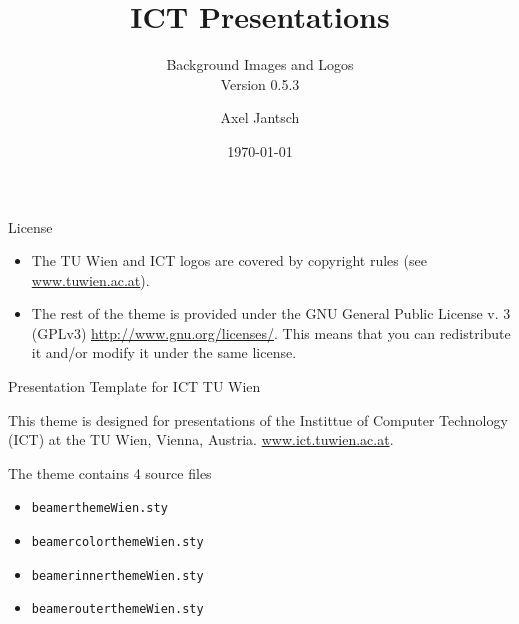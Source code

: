 \documentclass[aspectratio=169]{beamer}
\title[ICT Presentations]{ICT Presentations}
\subtitle{Background Images and Logos\\
Version 0.5.3}
\author[A. Jantsch]{Axel Jantsch}
\institute[TU Wien]{TU Wien, Vienna, Austria}
\date{\today}
\begin{document}
\begin{frame}
  \titlepage
\end{frame}      


\begin{frame}{License}
  
\begin{itemize}
\item The TU Wien and ICT logos are covered by copyright rules (see
  \href{www.tuwien.ac.at}{www.tuwien.ac.at}).
\item The rest of the theme is provided under the GNU General Public
  License v. 3 (GPLv3) \href{http://www.gnu.org/licenses/}{http://www.gnu.org/licenses/}. This means that you can redistribute it and/or modify it under the same license. 
\end{itemize}
\end{frame}


\begin{frame}{Presentation Template for ICT TU Wien}

  \begin{block}{}
    This theme is designed for presentations of the Instittue of
    Computer Technology (ICT) at the TU Wien, Vienna, Austria.
    \href{www.ict.tuwien.ac.at}{www.ict.tuwien.ac.at}.
  \end{block}

  \vspace{3ex}
  \begin{block}{The theme contains 4 source files}

  \begin{itemize}
  \item  {\tt beamerthemeWien.sty}
  \item  {\tt beamercolorthemeWien.sty}
  \item  {\tt beamerinnerthemeWien.sty}
  \item  {\tt beamerouterthemeWien.sty}
  \end{itemize}
\end{block}
\end{frame} 
\end{document}
